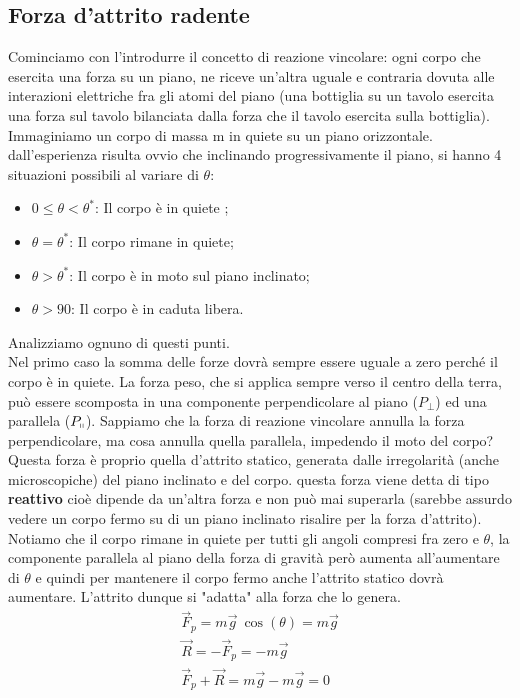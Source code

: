 \subsection{Forza d'attrito radente}
Cominciamo con l'introdurre il concetto di reazione vincolare: ogni corpo che esercita una forza su un piano, ne riceve un'altra uguale e contraria dovuta alle interazioni elettriche fra gli atomi del piano (una bottiglia su un tavolo esercita una forza sul tavolo bilanciata dalla forza che il tavolo esercita sulla bottiglia).\\
Immaginiamo un corpo di massa m in quiete su un piano orizzontale. dall'esperienza risulta ovvio che inclinando progressivamente il piano, si hanno 4 situazioni possibili al variare di $\theta$:\\
\begin{itemize}
\item $0 \leq \theta < \theta^*$: Il corpo è in quiete ;
\item $\theta = \theta^*$: Il corpo rimane in quiete;
\item $\theta > \theta^*$: Il corpo è in moto sul piano inclinato;
\item $\theta > 90$\textdegree: Il corpo è in caduta libera.
\end{itemize}
Analizziamo ognuno di questi punti.\\
Nel primo caso la somma delle forze dovrà sempre essere uguale a zero perché il corpo è in quiete. La forza peso, che si applica sempre verso il centro della terra, può essere scomposta in una componente perpendicolare al piano ($P_\perp$) ed una parallela ($P_\shortparallel$). Sappiamo che la forza di reazione vincolare annulla la forza perpendicolare, ma cosa annulla quella parallela, impedendo il moto del corpo? Questa forza è proprio quella d'attrito statico, generata dalle irregolarità (anche microscopiche) del piano inclinato e del corpo. questa forza viene detta di tipo \textbf{reattivo} cioè dipende da un'altra forza e non può mai superarla (sarebbe assurdo vedere un corpo fermo su di un piano inclinato risalire per la forza d'attrito). Notiamo che il corpo rimane in quiete per tutti gli angoli compresi fra zero e $\theta$, la componente parallela al piano della forza di gravità però aumenta all'aumentare di $\theta$ e quindi per mantenere il corpo fermo anche l'attrito statico dovrà aumentare. L'attrito dunque si "adatta" alla forza che lo genera.  
\begin{align*}
\vec{F}_p= m\vec{g}\ \cos(\theta)=m\vec{g}\\
\vec{R}=-\vec{F}_p=-m\vec{g}\\
\vec{F}_p+\vec{R}= m\vec{g}-m\vec{g}=0
\end{align*}
